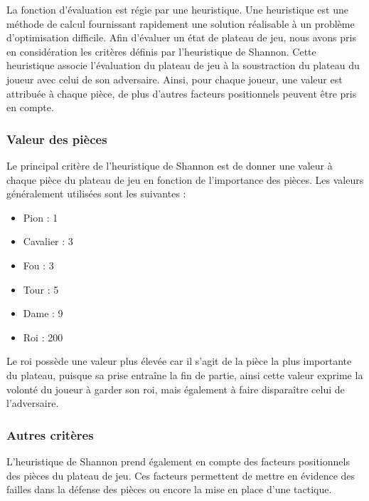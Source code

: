 \documentclass{article}
\begin{document}
La fonction d'évaluation est régie par une heuristique.
Une heuristique est une méthode de calcul fournissant rapidement une solution réalisable à un problème d'optimisation difficile.
\newline
Afin d'évaluer un état de plateau de jeu, nous avons pris en considération les critères définis par l'heuristique de Shannon\cite{Shannon_Heuristic}. Cette heuristique associe l'évaluation du plateau de jeu à la soustraction du plateau du joueur avec celui de son adversaire. Ainsi, pour chaque joueur, une valeur est attribuée à chaque pièce, de plus d'autres facteurs positionnels peuvent être pris en compte.
\subsubsection{Valeur des pièces}
Le principal critère de l'heuristique de Shannon est de donner une valeur à chaque pièce du plateau de jeu en fonction de l'importance des pièces. 
\newline
Les valeurs généralement utilisées sont les suivantes :
\begin{itemize}
    \item Pion : 1
    \item Cavalier : 3
    \item Fou : 3
    \item Tour : 5
    \item Dame : 9
    \item Roi : 200
\end{itemize}
Le roi possède une valeur plus élevée car il s'agit de la pièce la plus importante du plateau, puisque sa prise entraîne la fin de partie, ainsi cette valeur exprime la volonté du joueur à garder son roi, mais également à faire disparaître celui de l'adversaire.

\subsubsection{Autres critères} \label{criteres}
L'heuristique de Shannon prend également en compte des facteurs positionnels des pièces du plateau de jeu. Ces facteurs permettent de mettre en évidence des failles dans la défense des pièces ou encore la mise en place d'une tactique.
\newline
\end{document}
